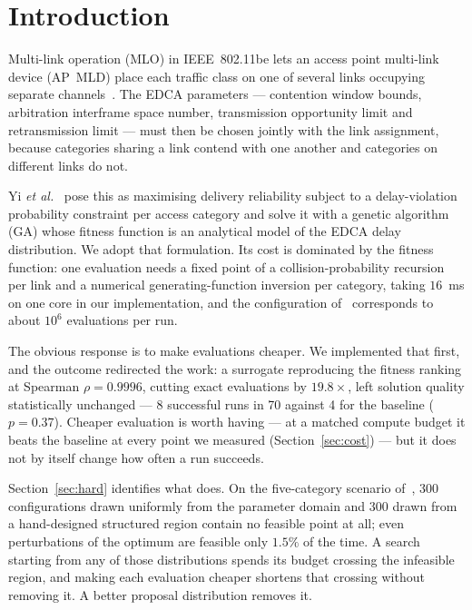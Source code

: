 \documentclass[journal,a4paper,comsoc,twocolumn]{IEEEtran}
\begin{document}
\section{Introduction}
\label{sec:intro}

Multi-link operation (MLO) in IEEE~802.11be lets an access point multi-link
device (AP~MLD) place each traffic class on one of several links occupying
separate channels~\cite{Khorov2020,LopezPerez2019,LopezRaventos2022}. The EDCA
parameters --- contention window bounds, arbitration interframe space number,
transmission opportunity limit and retransmission limit --- must then be chosen
jointly with the link assignment, because categories sharing a link contend with
one another and categories on different links do not.

Yi \emph{et al.}~\cite{Yi2025} pose this as maximising delivery reliability
subject to a delay-violation probability constraint per access category and
solve it with a genetic algorithm (GA) whose fitness function is an analytical
model of the EDCA delay distribution. We adopt that formulation. Its cost is
dominated by the fitness function: one evaluation needs a fixed point of a
collision-probability recursion per link and a numerical
generating-function inversion per category, taking $16$~ms on one core in our
implementation, and the configuration of~\cite[Table~I]{Yi2025} corresponds to
about $10^{6}$ evaluations per run.

The obvious response is to make evaluations cheaper. We implemented that first,
and the outcome redirected the work: a surrogate reproducing the fitness ranking
at Spearman $\rho = 0.9996$, cutting exact evaluations by $19.8\times$, left
solution quality statistically unchanged --- 8 successful runs in 70 against 4
for the baseline ($p = 0.37$). Cheaper evaluation is worth having --- at a
matched compute budget it beats the baseline at every point we measured
(Section~\ref{sec:cost}) --- but it does not by itself change how often a run
succeeds.

Section~\ref{sec:hard} identifies what does. On the five-category scenario
of~\cite[Sec.~V]{Yi2025}, 300 configurations drawn uniformly from the parameter
domain and 300 drawn from a hand-designed structured region contain no feasible
point at all; even perturbations of the optimum are feasible only $1.5\%$ of the
time. A search starting from any of those distributions spends its budget
crossing the infeasible region, and making each evaluation cheaper shortens
that crossing without removing it. A better proposal distribution removes
it.
\end{document}
